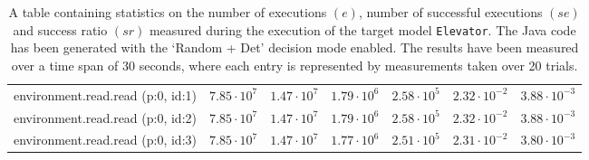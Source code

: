 \begin{table}[htbp]
{\begin{tabular}{lrrrrrr}
\hspace{3mm}environment.read.read (p:0, id:1) & $7.85 \cdot 10^{7}$ & $1.47 \cdot 10^{7}$ & $1.79 \cdot 10^{6}$ & $2.58 \cdot 10^{5}$ & $2.32 \cdot 10^{-2}$ & $3.88 \cdot 10^{-3}$ \\
\hspace{3mm}environment.read.read (p:0, id:2) & $7.85 \cdot 10^{7}$ & $1.47 \cdot 10^{7}$ & $1.79 \cdot 10^{6}$ & $2.58 \cdot 10^{5}$ & $2.32 \cdot 10^{-2}$ & $3.88 \cdot 10^{-3}$ \\
\hspace{3mm}environment.read.read (p:0, id:3) & $7.85 \cdot 10^{7}$ & $1.47 \cdot 10^{7}$ & $1.77 \cdot 10^{6}$ & $2.51 \cdot 10^{5}$ & $2.31 \cdot 10^{-2}$ & $3.80 \cdot 10^{-3}$ \\
\bottomrule
\end{tabular}
}
\caption{A table containing statistics on the number of executions $(e)$, number of successful executions $(se)$ and success ratio $(sr)$ measured during the execution of the target model \texttt{Elevator}. The Java code has been generated with the `Random + Det' decision mode enabled. The results have been measured over a time span of 30 seconds, where each entry is represented by measurements taken over 20 trials.}
\label{table:frequency_results_elevator_random_det}
\end{table}